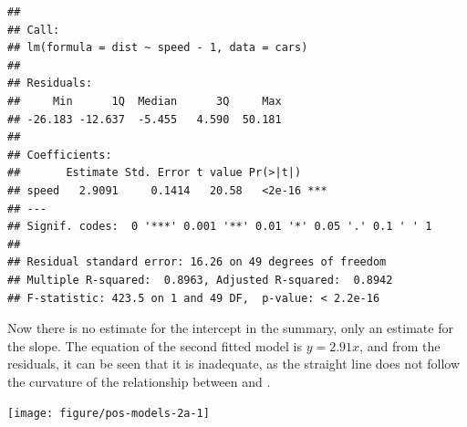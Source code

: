 \documentclass[krantz2]{krantz}\usepackage{knitr}%
\begin{document}
\begin{knitrout}\footnotesize
{}\color{fgcolor}\begin{kframe}
\begin{alltt}
 \hlkwb{<-}  \hlopt{~}  \hlopt{-} \hlstd{,} 
\end{alltt}
\begin{verbatim}
## 
## Call:
## lm(formula = dist ~ speed - 1, data = cars)
## 
## Residuals:
##     Min      1Q  Median      3Q     Max 
## -26.183 -12.637  -5.455   4.590  50.181 
## 
## Coefficients:
##       Estimate Std. Error t value Pr(>|t|)    
## speed   2.9091     0.1414   20.58   <2e-16 ***
## ---
## Signif. codes:  0 '***' 0.001 '**' 0.01 '*' 0.05 '.' 0.1 ' ' 1
## 
## Residual standard error: 16.26 on 49 degrees of freedom
## Multiple R-squared:  0.8963,	Adjusted R-squared:  0.8942 
## F-statistic: 423.5 on 1 and 49 DF,  p-value: < 2.2e-16
\end{verbatim}
\end{kframe}
\end{knitrout}

Now there is no estimate for the intercept in the summary, only an estimate for the slope. The equation of the second fitted model is $y = 2.91 x$, and from the residuals, it can be seen that it is inadequate, as the straight line does not follow the curvature of the relationship between  and .

\begin{knitrout}\footnotesize
{}\color{fgcolor}\begin{kframe}
\begin{alltt}
  \hlstd{=} \hlstd{)}
\end{alltt}
\end{kframe}

{\centering \texttt{[image: figure/pos-models-2a-1]} 

}



\end{knitrout}
\end{document}
